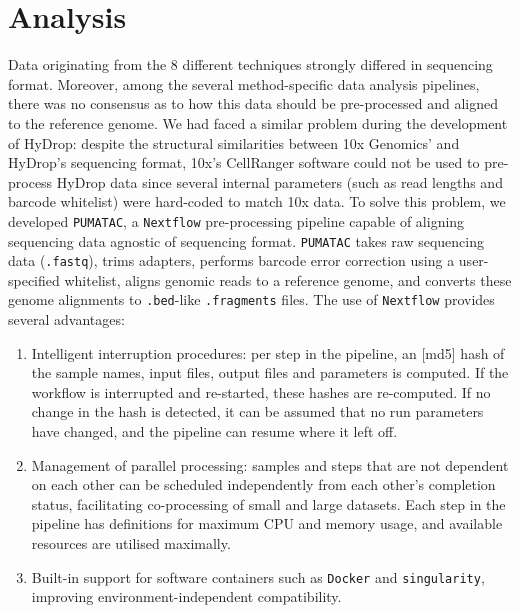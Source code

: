 \section{Analysis}
Data originating from the 8 different techniques strongly differed in sequencing format. Moreover, among the several method-specific data analysis pipelines, there was no consensus as to how this data should be pre-processed and aligned to the reference genome. We had faced a similar problem during the development of HyDrop: despite the structural similarities between 10x Genomics' and HyDrop's sequencing format, 10x's CellRanger software could not be used to pre-process HyDrop data since several internal parameters (such as read lengths and barcode whitelist) were hard-coded to match 10x data. To solve this problem, we developed \verb|PUMATAC|, a \verb|Nextflow| pre-processing pipeline capable of aligning sequencing data agnostic of sequencing format. \verb|PUMATAC| takes raw sequencing data (\verb|.fastq|), trims adapters, performs barcode error correction using a user-specified whitelist, aligns genomic reads to a reference genome, and converts these genome alignments to \verb|.bed|-like \verb|.fragments| files. The use of \verb|Nextflow| provides several advantages:

\begin{enumerate}[noitemsep]
	\item Intelligent interruption procedures: per step in the pipeline, an [md5] hash of the sample names, input files, output files and parameters is computed. If the workflow is interrupted and re-started, these hashes are re-computed. If no change in the hash is detected, it can be assumed that no run parameters have changed, and the pipeline can resume where it left off.
	\item Management of parallel processing: samples and steps that are not dependent on each other can be scheduled independently from each other's completion status, facilitating co-processing of small and large datasets. Each step in the pipeline has definitions for maximum CPU and memory usage, and available resources are utilised maximally.
	\item Built-in support for software containers such as \verb|Docker| and \verb|singularity|, improving environment-independent compatibility.
\end{enumerate}

